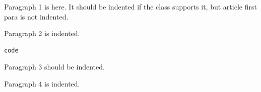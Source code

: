 \documentclass{article}
\newcommand{\fonte}{\caption*{Fonte: Autoria propria.}}
\begin{document}
Paragraph 1 is here. It should be indented if the class supports it, but article first para is not indented.

Paragraph 2 is indented.

\begin{center}
\end{center}
\vspace{-\baselineskip}
\begin{lstlisting}
code
\end{lstlisting}
\vspace{-0.5\baselineskip}
\begin{center}
\begingroup{}\fonte{}\endgroup
\end{center}

Paragraph 3 should be indented.

Paragraph 4 is indented.
\end{document}
